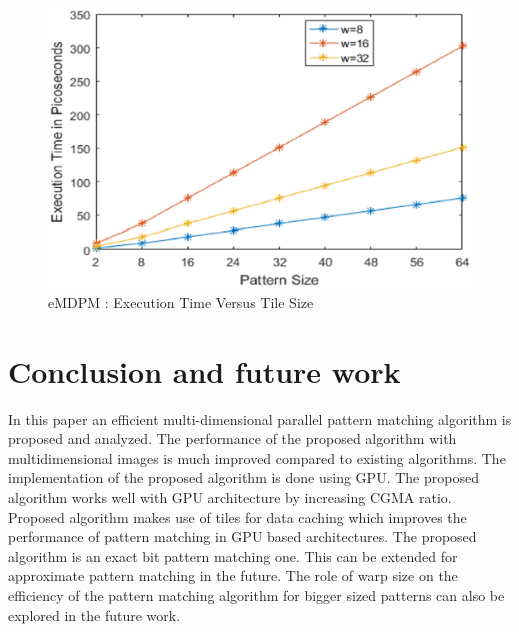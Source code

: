\documentclass[graybox]{svmult}
\begin{document}
\begin{figure}
\sidecaption
\includegraphics[scale=.49]{executiontime.eps}
%
%
\caption{eMDPM : Execution Time Versus Tile Size}
\label{fig:3}       %
\end{figure}

\section{Conclusion and future work}
\label{sec:5}
In this paper an efficient multi-dimensional parallel pattern matching algorithm is proposed and analyzed. The performance of the proposed algorithm with multidimensional images is much improved compared to existing algorithms. The implementation of the proposed algorithm is done using GPU. The proposed algorithm works well with GPU architecture by increasing CGMA ratio. Proposed algorithm makes use of tiles for data caching which improves the performance of pattern matching in GPU based architectures. The proposed algorithm is an exact bit pattern matching one. This can be extended for approximate pattern matching in the future. The role of warp size on the efficiency of the pattern matching algorithm for bigger sized patterns can also be explored in the future work.



\end{document}
